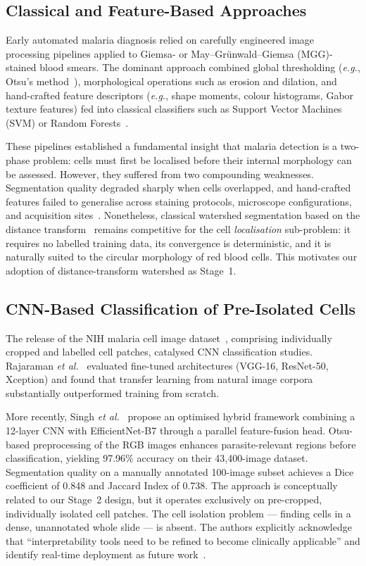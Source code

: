 \documentclass[review,12pt]{elsarticle}
\newcommand{\eg}{\textit{e.g.}}
\newcommand{\etal}{\textit{et al.}}
\begin{document}
\subsection{Classical and Feature-Based Approaches}
\label{ssec:classical}

Early automated malaria diagnosis relied on carefully engineered image
processing pipelines applied to Giemsa- or May--Gr\"{u}nwald--Giemsa
(MGG)-stained blood smears. The dominant approach combined global
thresholding (\eg, Otsu's method~\cite{otsu1979}), morphological
operations such as erosion and dilation, and hand-crafted feature
descriptors (\eg, shape moments, colour histograms, Gabor texture
features) fed into classical classifiers such as Support Vector Machines
(SVM) or Random Forests~\cite{poostchi2018}.

These pipelines established a fundamental insight that malaria detection
is a two-phase problem: cells must first be localised before their internal
morphology can be assessed. However, they suffered from two compounding
weaknesses. Segmentation quality degraded sharply when cells overlapped,
and hand-crafted features failed to generalise across staining protocols,
microscope configurations, and acquisition sites~\cite{poostchi2018,delgado2020}.
Nonetheless, classical watershed segmentation based on the distance
transform~\cite{beucher1992} remains competitive for the cell
\emph{localisation} sub-problem: it requires no labelled training data,
its convergence is deterministic, and it is naturally suited to the circular
morphology of red blood cells. This motivates our adoption of
distance-transform watershed as Stage~1.

\subsection{CNN-Based Classification of Pre-Isolated Cells}
\label{ssec:cnn_class}

The release of the NIH malaria cell image dataset~\cite{rajaraman2019},
comprising individually cropped and labelled cell patches, catalysed CNN
classification studies. Rajaraman \etal~\cite{rajaraman2019} evaluated
fine-tuned architectures (VGG-16, ResNet-50, Xception) and found that
transfer learning from natural image corpora substantially outperformed
training from scratch.

More recently, Singh \etal~\cite{singh2025} propose an optimised hybrid
framework combining a 12-layer CNN with EfficientNet-B7 through a parallel
feature-fusion head. Otsu-based preprocessing of the RGB images enhances
parasite-relevant regions before classification, yielding 97.96\% accuracy
on their 43,400-image dataset. Segmentation quality on a manually annotated
100-image subset achieves a Dice coefficient of 0.848 and Jaccard Index
of 0.738. The approach is conceptually related to our Stage~2 design, but
it operates exclusively on pre-cropped, individually isolated cell patches.
The cell isolation problem --- finding cells in a dense, unannotated whole
slide --- is absent. The authors explicitly acknowledge that
``interpretability tools need to be refined to become clinically
applicable'' and identify real-time deployment as future work~\cite{singh2025}.
\end{document}
